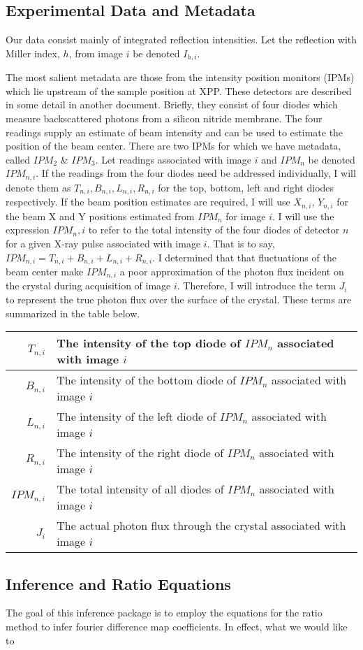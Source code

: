 \documentclass{report}
\begin{document}
\subsection{Experimental Data and Metadata}
Our data consist mainly of integrated reflection intensities. Let the reflection with Miller index, $h$, from image $i$ be denoted $I_{h,i}$. 

The most salient metadata are those from the intensity position monitors (IPMs) which lie upstream of the sample position at XPP. 
These detectors are described in some detail in another document. 
Briefly, they consist of four diodes which measure backscattered photons from a silicon nitride membrane.
The four readings supply an estimate of beam intensity and can be used to estimate the position of the beam center. 
There are two IPMs for which we have metadata, called $IPM_2$ \& $IPM_3$. 
Let readings associated with image $i$ and $IPM_n$ be denoted $IPM_{n,i}$.
If the readings from the four diodes need be addressed individually, I will denote them as $T_{n, i}, B_{n, i}, L_{n, i}, R_{n, i}$ for the top, bottom, left and right diodes respectively. 
If the beam position estimates are required, I will use $X_{n,i}$, $Y_{n,i}$ for the beam X and Y positions estimated from $IPM_n$ for image $i$. 
I will use the expression $IPM_n,i$ to refer to the total intensity of the four diodes of detector $n$ for a given X-ray pulse associated with image $i$. 
That is to say, $IPM_{n,i} = T_{n,i}+B_{n,i}+L_{n,i}+R_{n,i}$.
I determined that that fluctuations of the beam center make $IPM_{n,i}$ a poor approximation of the photon flux incident on the crystal during acquisition of image $i$. 
Therefore, I will introduce the term $J_i$ to represent the true photon flux over the surface of the crystal. 
These terms are summarized in the table below.

\begin{center}
\begin{tabular}{r | p{}}
$T_{n,i}$ & The intensity of the top diode of $IPM_n$ associated with image $i$ \\ \hline
$B_{n,i}$ & The intensity of the bottom diode of $IPM_n$ associated with image $i$ \\ \hline
$L_{n,i}$ & The intensity of the left diode of $IPM_n$ associated with image $i$ \\ \hline
$R_{n,i}$ & The intensity of the right diode of $IPM_n$ associated with image $i$ \\ \hline
$IPM_{n,i}$ & The total intensity of all diodes of $IPM_n$ associated with image $i$ \\ \hline
$J_i$ & The actual photon flux through the crystal associated with image $i$ \\ 
\end{tabular} 
\end{center}

\subsection{Inference and Ratio Equations}
The goal of this inference package is to employ the equations for the ratio method \cite{coppens} to infer fourier difference map coefficients. 
In effect, what we would like to 
\end{document}
